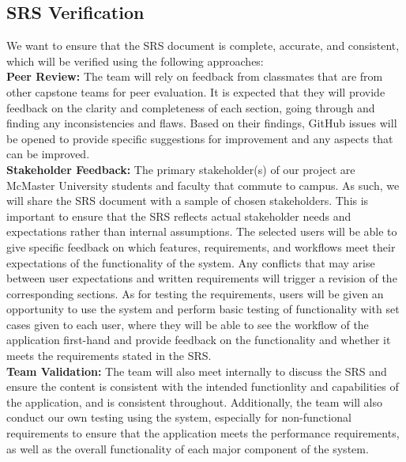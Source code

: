 \documentclass[12pt, titlepage]{article}
\begin{document}
\subsection{SRS Verification}

We want to ensure that the SRS document is complete, accurate, and consistent, which will be verified using the following approaches: \\

\noindent \textbf{Peer Review:} The team will rely on feedback from classmates that are from other capstone teams for peer evaluation. It is expected that they will provide feedback on the clarity and completeness of each section, going through and finding any inconsistencies and flaws. Based on their findings, GitHub issues will be opened to provide specific suggestions for improvement and any aspects that can be improved. \\ 

\noindent \textbf{Stakeholder Feedback:} The primary stakeholder(s) of our project are McMaster University students and faculty that commute to campus. As such, we will share the SRS document with a sample of chosen stakeholders. This is important to ensure that the SRS reflects actual stakeholder needs and expectations rather than internal assumptions. The selected users will be able to give specific feedback on which features, requirements, and workflows meet their expectations of the functionality of the system. Any conflicts that may arise between user expectations and written requirements will trigger a revision of the corresponding sections. As for testing the requirements, users will be given an opportunity to use the system and  perform basic testing of functionality with set cases given to each user, where they will be able to see the workflow of the application first-hand and provide feedback on the functionality and whether it meets the requirements stated in the SRS. \\

\noindent \textbf{Team Validation:} The team will also meet internally to discuss the SRS and ensure the content is consistent with the intended functionlity and capabilities of the application, and is consistent throughout. Additionally, the team will also conduct our own testing using the system, especially for non-functional requirements to ensure that the application meets the performance requirements, as well as the overall functionality of each major component of the system. \\
\end{document}
